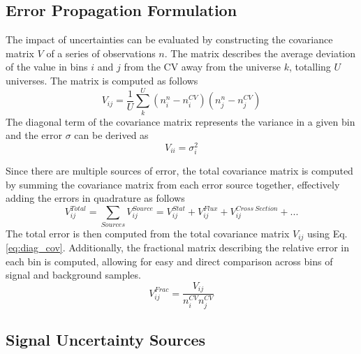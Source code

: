\subsection{Error Propagation Formulation}
\label{sec:error_prop}

The impact of uncertainties can be evaluated by constructing the covariance matrix $V$ of a series of observations $n$.
The matrix describes the average deviation of the value in bins $i$ and $j$ from the CV away from the universe $k$, totalling $U$ universes.
The matrix is computed as follows
\begin{equation}
	V_{ij} = \frac{1}{U}\sum^{U}_{k} \left( n^n_{i} - n^{CV}_{i} \right) \left( n^n_{j} - n^{CV}_{j} \right)
\end{equation}
The diagonal term of the covariance matrix represents the variance in a given bin and the error $\sigma$ can be derived as
\begin{equation}
\label{eq:diag_cov}
	V_{ii} = \sigma^2_i
\end{equation}

Since there are multiple sources of error, the total covariance matrix is computed by summing the covariance matrix from each error source together, effectively adding the errors in quadrature as follows
\begin{equation}
	V^{Total}_{ij} = \sum_{Sources} V_{ij}^{Source} = V_{ij}^{Stat} + V_{ij}^{Flux} +V_{ij}^{Cross\ Section} + ...
\end{equation}
The total error is then computed from the total covariance matrix $V_{ij}$ using Eq. \ref{eq:diag_cov}.
Additionally, the fractional matrix describing the relative error in each bin is computed, allowing for easy and direct comparison across bins of signal and background samples. 
\begin{equation}
	V_{ij}^{Frac} = \frac{V_{ij}}{n_i^{CV}n_j^{CV}}
\end{equation}

\subsection{Signal Uncertainty Sources}
\label{sec:signal_error}

